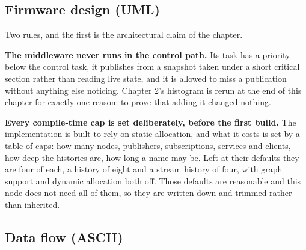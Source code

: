 \subsection*{Firmware design (UML)}


Two rules, and the first is the architectural claim of the chapter.

\textbf{The middleware never runs in the control path.} Its task has a priority
below the control task, it publishes from a snapshot taken under a short critical
section rather than reading live state, and it is allowed to miss a publication
without anything else noticing. Chapter 2's histogram is rerun at the end of this
chapter for exactly one reason: to prove that adding it changed nothing.

\textbf{Every compile-time cap is set deliberately, before the first build.} The
implementation is built to rely on static allocation, and what it costs is set by
a table of caps: how many nodes, publishers, subscriptions, services and clients,
how deep the histories are, how long a name may be. Left at their defaults they
are four of each, a history of eight and a stream history of four, with graph
support and dynamic allocation both off. Those defaults are reasonable and this
node does not need all of them, so they are written down and trimmed rather than
inherited.

\subsection*{Data flow (ASCII)}

